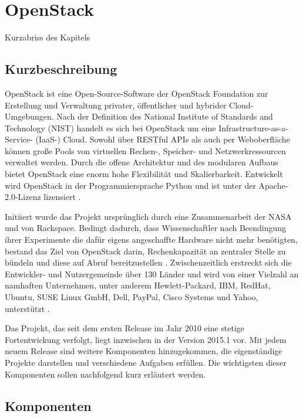 \chapter{OpenStack}

Kurzabriss des Kapitels

\section{Kurzbeschreibung}OpenStack ist eine Open-Source-Software der OpenStack Foundation zur Erstellung und Verwaltung privater, öffentlicher und hybrider Cloud-Umgebungen. Nach der Definition des National Institute of Standards and Technology (NIST) handelt es sich bei OpenStack um eine  Infrastructure-as-a-Service- (IaaS-) Cloud. Sowohl über RESTful APIs als auch per Weboberfläche können große Pools von virtuellen Rechen-, Speicher- und Netzwerkressourcen verwaltet werden. Durch die offene Architektur und des modularen Aufbaus bietet OpenStack eine enorm hohe Flexibilität und Skalierbarkeit. Entwickelt wird OpenStack in der Programmiersprache Python und ist unter der Apache-2.0-Lizenz lizensiert \cite[vgl.][S. 7ff]{Beitter}. 

Initiiert wurde das Projekt ursprünglich durch eine Zusammenarbeit der NASA und von Rackspace. Bedingt dadurch, dass Wissenschaftler nach Beendingung ihrer Experimente die dafür eigens angeschaffte Hardware nicht mehr benötigten, bestand das Ziel von OpenStack darin, Rechenkapazität an zentraler Stelle zu bündeln und diese auf Abruf bereitzustellen \cite[vgl.][]{Loschwitz}. Zwischenzeitlich erstreckt sich die Entwickler- und Nutzergemeinde über 130 Länder und wird von einer Vielzahl an namhaften Unternehmen, unter anderem Hewlett-Packard, IBM, RedHat, Ubuntu, SUSE Linux GmbH, Dell, PayPal, Cisco Systems und Yahoo, unterstützt \cite[vgl.][S. 78]{Srinivasan2014}.

Das Projekt, das seit dem ersten Release im Jahr 2010 eine stetige Fortentwickung verfolgt, liegt inzwischen in der Version 2015.1 vor. Mit jedem neuem Release sind weitere Komponenten hinzugekommen, die eigenständige Projekte darstellen und verschiedene Aufgaben erfüllen. Die wichtigsten dieser Komponenten sollen nachfolgend kurz erläutert werden.

\section{Komponenten}
